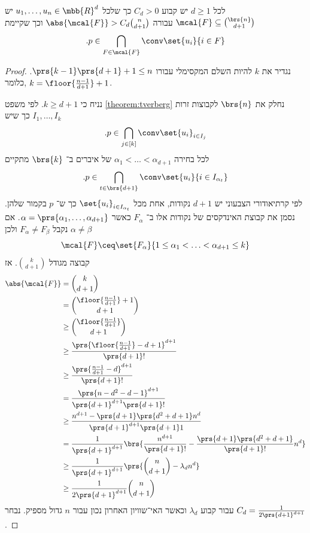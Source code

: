 \documentclass[a4paper,10pt,twoside,openany]{book}
\begin{document}
\begin{theorem}
לכל
$d \geq 1$
יש קבוע
$C_d > 0$
כך שלכל
$u_1, \ldots, u_n \in \mbb{R}^d$
יש
$\mcal{F} \subseteq \binom{\brs{n}}{d+1}$
עבורה
$\abs{\mcal{F}} > C_d \binom{n}{d+1}$
וכך שקיימת
\[\text{.} p \in \bigcap_{F \in \mcal{F}} \conv\set{u_i}{i \in F}\]
\end{theorem}

\begin{proof}
נגדיר את
$k$
להיות השלם המקסימלי עבורו
$\prs{k-1}\prs{d+1} + 1 \leq n$.
כלומר,
$k = \floor{\frac{n-1}{d+1}} + 1$.

נניח כי
$k \geq d+1$.
לפי משפט
\ref{theorem:tverberg}
נחלק את
$\brs{n}$
לקבוצות זרות
$I_1, \ldots, I_k$
כך שיש
\[\text{.} p \in \bigcap_{j \in [k]} \conv\set{u_i}_{i \in I_j}\]
לכל בחירה
$\alpha_1 < \ldots < \alpha_{d+1}$
של איברים ב־%
$\brs{k}$
מתקיים
\[\text{.} p \in \bigcap_{t \in \brs{d+1}} \conv\set{u_i}{i \in I_{\alpha_t}}\]
לפי קרתיאודורי הצבעוני יש
$d+1$
נקודות, אחת מכל
$\set{u_i}_{i \in I_{\alpha_t}}$
כך ש־%
$p$
בקמור שלהן.
נסמן את קבוצת האינדקסים של נקודות אלו ב־%
$F_{\alpha}$
כאשר
$\alpha = \prs{\alpha_1, \ldots, \alpha_{d+1}}$.
אם
$\alpha \neq \beta$
נקבל
$F_\alpha \neq F_\beta$
ולכן
\[\mcal{F} \ceq \set{F_{\alpha}}{1 \leq \alpha_1 < \ldots < \alpha_{d+1} \leq k}\]
קבוצה מגודל
$\binom{k}{d+1}$.
אז
\begin{align*}
\abs{\mcal{F}}
&=
\binom{k}{d+1}
\\&=
\binom{\floor{\frac{n-1}{d+1}} + 1}{d+1}
\\&\geq
\binom{\floor{\frac{n-1}{d+1}}}{d+1}
\\&\geq
\frac{\prs{\floor{\frac{n-1}{d+1}} - d + 1}^{d+1}}{\prs{d+1}!}
\\&\geq \frac{\prs{\frac{n-1}{d+1} - d}^{d+1}}{\prs{d+1}!}
\\&= \frac{\prs{n-d^2 - d - 1}^{d+1}}{\prs{d+1}^{d+1} \prs{d+1}!}
\\&\geq \frac{n^{d+1} - \prs{d+1}\prs{d^2 + d + 1} n^d}{\prs{d+1}^{d+1} \prs{d+1}1}
\\&= \frac{1}{\prs{d+1}^{d+1}} \brs{\frac{n^{d+1}}{\prs{d+1}!} - \frac{\prs{d+1}\prs{d^2 + d + 1}}{\prs{d+1}!} n^d}
\\&\geq \frac{1}{\prs{d+1}^{d+1}} \prs{\binom{n}{d+1} - \lambda_d n^d}
\\&\geq \frac{1}{2 \prs{d+1}^{d+1}} \binom{n}{d+1}
\end{align*}
עבור קבוע
$\lambda_d$
וכאשר האי־שוויון האחרון נכון עבור
$n$
גדול מספיק.
נבחר
$C_d = \frac{1}{2 \prs{d+1}^{d+1}}$.
\end{proof}
\end{document}
